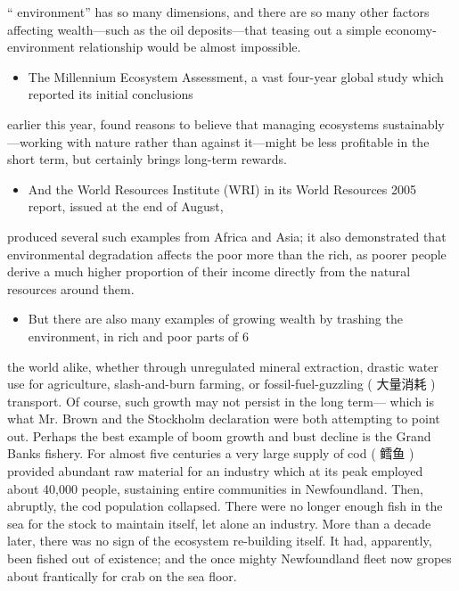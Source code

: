 \documentclass[UTF8,11pt]{ctexart}
\begin{document}
“ environment” has so many dimensions, and there are so many other factors affecting wealth—such as the oil deposits—that teasing out a simple economy-environment relationship would be almost impossible.


\begin{itemize}[leftmargin=2em,itemsep=.2em,topsep=.4em]\item[G.] The Millennium Ecosystem Assessment, a vast four-year global study which reported its initial conclusions
\end{itemize}

earlier this year, found reasons to believe that managing ecosystems sustainably—working with nature rather than against it—might be less profitable in the short term, but certainly brings long-term rewards.


\begin{itemize}[leftmargin=2em,itemsep=.2em,topsep=.4em]\item[H.] And the World Resources Institute (WRI) in its World Resources 2005 report, issued at the end of August,
\end{itemize}

produced several such examples from Africa and Asia; it also demonstrated that environmental degradation affects the poor more than the rich, as poorer people derive a much higher proportion of their income directly from the natural resources around them.


\begin{itemize}[leftmargin=2em,itemsep=.2em,topsep=.4em]\item[I.] But there are also many examples of growing wealth by trashing the environment, in rich and poor parts of 6
\end{itemize}

the world alike, whether through unregulated mineral extraction, drastic water use for agriculture, slash-and-burn farming, or fossil-fuel-guzzling ( 大量消耗 ) transport. Of course, such growth may not persist in the long term— which is what Mr. Brown and the Stockholm declaration were both attempting to point out. Perhaps the best example of boom growth and bust decline is the Grand Banks fishery. For almost five centuries a very large supply of cod ( 鳕鱼 ) provided abundant raw material for an industry which at its peak employed about 40,000 people, sustaining entire communities in Newfoundland. Then, abruptly, the cod population collapsed. There were no longer enough fish in the sea for the stock to maintain itself, let alone an industry. More than a decade later, there was no sign of the ecosystem re-building itself. It had, apparently, been fished out of existence; and the once mighty Newfoundland fleet now gropes about frantically for crab on the sea floor.
\end{document}
